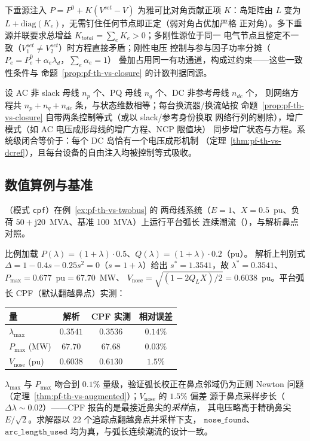 \begin{remark}[下垂源与参与因子的正则化作用]
下垂源注入 $P=P^{0}+K(V^{set}-V)$ 为雅可比对角贡献正项 $K$：岛矩阵由
$L$ 变为 $L+\mathrm{diag}(K_e)$，无需钉住任何节点即正定（弱对角占优加严格
正对角）。多下垂源并联要求总增益 $K_{total}=\sum_eK_e>0$；多刚性源位于同一
电气节点且整定不一致（$V_1^{set}\neq V_2^{set}$）时方程直接矛盾；刚性电压
控制与参与因子功率分摊（$P_e=P_e^{0}+\alpha_e\lambda_d$，$\sum_e\alpha_e=1$）
叠加占用同一有功通道，构成过约束——这些一致性条件与
命题~\ref{prop:pf-th-vs-closure} 的计数判据同源。
\end{remark}

\begin{remark}[方程闭合计数的系统级形式]
设 AC 非 slack 母线 $n_p$ 个、PQ 母线 $n_q$ 个、DC 非参考母线 $n_{dc}$ 个，
则网络方程共 $n_p+n_q+n_{dc}$ 条，与状态维数相等；每台换流器/换流站按
命题~\ref{prop:pf-th-vs-closure} 自带两条控制等式（或以 slack/参考身份换取
网络行列的剔除），增广模式（如 AC 电压成形母线的增广方程、NCP 限值块）
同步增广状态与方程。系统级闭合等价于：每个 DC 岛恰有一个电压成形机制
（定理~\ref{thm:pf-th-vs-dcref}），且每台设备的自由注入均被控制等式吸收。
\end{remark}

\subsection{数值算例与基准}\label{sec:pf-th-vs-numexp}

（模式 \texttt{cpf}）在例~\ref{ex:pf-th-vs-twobus} 的
两母线系统（$E=1$、$X=0.5$~pu、负荷 $50+\mathrm j20$~MVA、基准 100~MVA）上运行平台弧长
连续潮流（），与解析鼻点对照。

\begin{example}\label{ex:pf-th-vs-cpfnum}
比例加载 $P(\lambda)=(1{+}\lambda)\cdot0.5$、$Q(\lambda)=(1{+}\lambda)\cdot0.2$（pu）。
解析上判别式 $\Delta=1-0.4s-0.25s^2=0$（$s=1{+}\lambda$）给出 $s^*=1.3541$，故
$\lambda^*=0.3541$、$P_{\max}=0.677$~pu$=67.70$~MW、
$V_{\mathrm{nose}}=\sqrt{(1-2Q_LX)/2}=0.6038$~pu。平台弧长 CPF（默认翻越鼻点）实测：
\begin{center}\footnotesize
\begin{tabular}{@{}lccc@{}}
\toprule
量 & 解析 & CPF 实测 & 相对误差\\
\midrule
$\lambda_{\max}$      & $0.3541$ & $0.3536$ & $0.14\%$\\
$P_{\max}$ (MW)       & $67.70$  & $67.68$  & $0.03\%$\\
$V_{\mathrm{nose}}$ (pu) & $0.6038$ & $0.6130$ & $1.5\%$\\
\bottomrule
\end{tabular}
\end{center}
$\lambda_{\max}$ 与 $P_{\max}$ 吻合到 $0.1\%$ 量级，验证弧长校正在鼻点邻域仍为正则
Newton 问题（定理~\ref{thm:pf-th-vs-augmented}）；$V_{\mathrm{nose}}$ 的 $1.5\%$ 偏差
源于鼻点采样步长（$\Delta\lambda\!\sim\!0.02$）——CPF 报告的是最接近鼻尖的\emph{采样}点，
其电压略高于精确鼻尖 $E/\!\sqrt2$。求解器以 $22$ 个追踪点翻越鼻点并采样下支，
$\mathtt{nose\_found}$、$\mathtt{arc\_length\_used}$ 均为真，与弧长连续潮流的设计一致。
\end{example}

